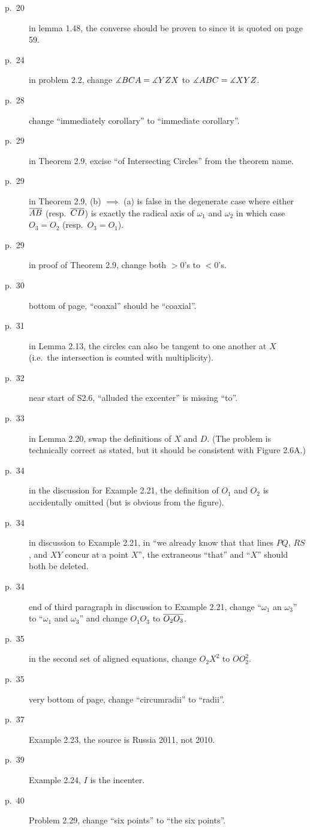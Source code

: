 \documentclass[11pt]{scrartcl}
\begin{document}
\begin{description}
\item[p.\  20] in lemma 1.48, the converse should be proven to since it is quoted on page 59.
\item[p.\  24] in problem 2.2, change $\measuredangle BCA = \measuredangle YZX$
  to $\measuredangle ABC = \measuredangle XYZ$.
\item[p.\  28] change ``immediately corollary'' to ``immediate corollary''.
\item[p.\  29] in Theorem 2.9, excise ``of Intersecting Circles'' from the theorem name.
\item[p.\  29] in Theorem 2.9, (b) $\implies$ (a) is false in the degenerate case
  where either $\overline{AB}$ (resp.\ $\overline{CD}$) is exactly the radical axis of $\omega_1$ and $\omega_2$
  in which case $O_3 = O_2$ (resp.\ $O_3 = O_1$).
\item[p.\  29] in proof of Theorem 2.9, change both $>0$'s to $<0$'s.
\item[p.\  30] bottom of page, ``coaxal'' should be ``coaxial''.
\item[p.\  31] in Lemma 2.13, the circles can also be tangent
  to one another at $X$ (i.e.\ the intersection is counted with multiplicity).
\item[p.\  32] near start of S2.6, ``alluded the excenter'' is missing ``to''.
\item[p.\  33] in Lemma 2.20, swap the definitions of $X$ and $D$.
  (The problem is technically correct as stated,
  but it should be consistent with Figure 2.6A.)
\item[p.\  34] in the discussion for Example 2.21,
  the definition of $O_1$ and $O_2$ is accidentally omitted (but is obvious from the figure).
\item[p.\  34] in discussion to Example 2.21, in
  ``we already know that that lines $PQ$, $RS$, and $XY$ concur at a point $X$'',
  the extraneous ``that'' and ``$X$'' should both be deleted.
\item[p.\  34] end of third paragraph in discussion to Example 2.21,
  change ``$\omega_1$ an $\omega_3$'' to ``$\omega_1$ and $\omega_3$''
  and change $O_1O_3$ to $\overline{O_2O_3}$.
\item[p.\  35] in the second set of aligned equations,
  change $O_2X^2$ to $OO_2^2$.
\item[p.\  35] very bottom of page, change ``circumradii'' to ``radii''.
\item[p.\  37] Example 2.23, the source is Russia 2011, not 2010.
\item[p.\  39] Example 2.24, $I$ is the incenter.
\item[p.\  40] Problem 2.29, change ``six points'' to ``the six points''.

\end{description}
\end{document}
